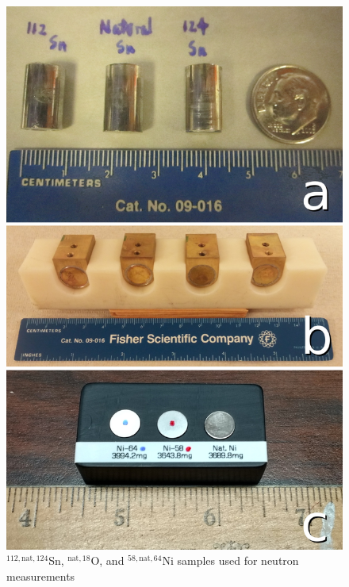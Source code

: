 \begin{figure}
    \includegraphics[scale=0.23]{figures/AllIsotopicSamples.jpg}
    \caption{${^{112,\text{nat},124}}$Sn, $^{{\text{nat}, 18}}$O, and ${^{58,\text{nat},64}}$Ni
samples used for neutron \tot measurements}
    \label{SamplesImage}
\end{figure}

